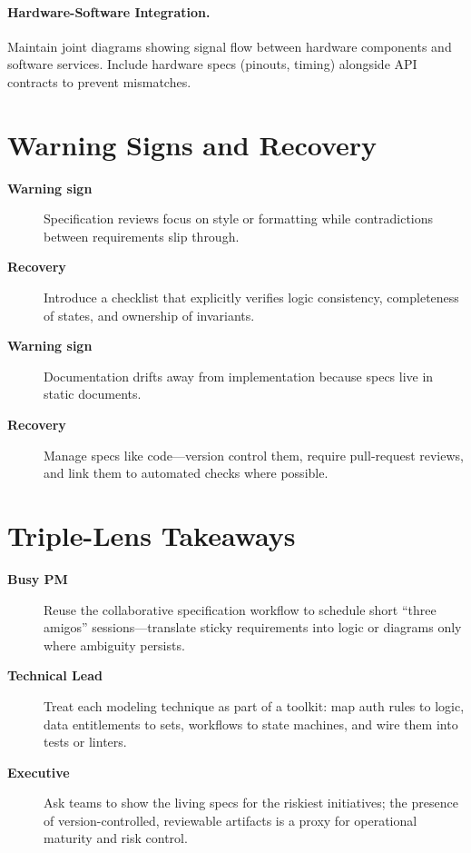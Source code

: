 \paragraph{Hardware-Software Integration.} Maintain joint diagrams showing signal flow between hardware components and software services. Include hardware specs (pinouts, timing) alongside API contracts to prevent mismatches.
\section{Warning Signs and Recovery}
\label{sec:reqspec-warning}
\begin{description}
    \item[\textbf{Warning sign}] Specification reviews focus on style or formatting while contradictions between requirements slip through.
    \item[\textbf{Recovery}] Introduce a checklist that explicitly verifies logic consistency, completeness of states, and ownership of invariants.
    \item[\textbf{Warning sign}] Documentation drifts away from implementation because specs live in static documents.
    \item[\textbf{Recovery}] Manage specs like code—version control them, require pull-request reviews, and link them to automated checks where possible.
\end{description}

\section{Triple-Lens Takeaways}
\label{sec:req-spec-triple}

\begin{description}
    \item[\textbf{Busy PM}] Reuse the collaborative specification workflow to schedule short ``three amigos'' sessions—translate sticky requirements into logic or diagrams only where ambiguity persists.
    \item[\textbf{Technical Lead}] Treat each modeling technique as part of a toolkit: map auth rules to logic, data entitlements to sets, workflows to state machines, and wire them into tests or linters.
    \item[\textbf{Executive}] Ask teams to show the living specs for the riskiest initiatives; the presence of version-controlled, reviewable artifacts is a proxy for operational maturity and risk control.
\end{description}
